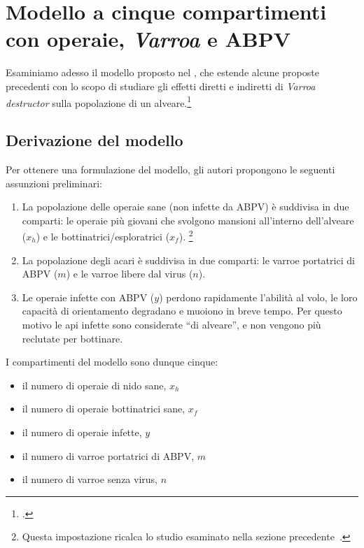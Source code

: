 \section{Modello a cinque compartimenti con operaie, \emph{Varroa} e ABPV}
Esaminiamo adesso il modello proposto nel \citeyear{ratti2017}, che estende alcune proposte precedenti con lo scopo di studiare gli effetti diretti e indiretti di \emph{Varroa destructor} sulla popolazione
di un alveare.\footcite{ratti2017}

\subsection{Derivazione del modello}
Per ottenere una formulazione del modello, gli autori propongono le seguenti assunzioni preliminari:
\begin{enumerate}
    \item La popolazione delle operaie sane (non infette da ABPV) è suddivisa in due comparti: le operaie più giovani che svolgono mansioni all'interno dell'alveare ($x_h$) e le bottinatrici/esploratrici ($x_f$).
    \footnote{Questa impostazione ricalca lo studio esaminato nella sezione
    precedente~\parencite{khoury2011}.}
    \item La popolazione degli acari è suddivisa in due comparti: le varroe portatrici di ABPV ($m$) e le varroe libere dal virus ($n$).
    \item Le operaie infette con ABPV ($y$) perdono rapidamente l'abilità al volo, le loro capacità di
    orientamento degradano e muoiono in breve tempo. Per questo motivo le api infette sono considerate
    ``di alveare'', e non vengono più reclutate per bottinare.
\end{enumerate}

I compartimenti del modello sono dunque cinque:
\begin{itemize}
    \item il numero di operaie di nido sane, $x_h$
    \item il numero di operaie bottinatrici sane, $x_f$
    \item il numero di operaie infette, $y$
    \item il numero di varroe portatrici di ABPV, $m$
    \item il numero di varroe senza virus, $n$
\end{itemize}

